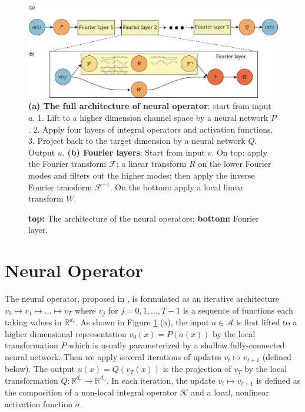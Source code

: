 \documentclass{article} %
\newcommand{\R}{\mathbb{R}}
\newcommand{\A}{\mathcal{A}}
\newcommand{\cG}{\mathcal{F}}
\newcommand{\cK}{\mathcal{K}}
\begin{document}

\begin{figure}
    \centering
    \includegraphics[width=14cm]{figs/fourier_full_arch5.png}\\
    \small{
    {\bf (a) The full architecture of neural operator}: start from input $a$. 1. Lift to a higher dimension channel space by a neural network $P$. 2. Apply four layers of integral operators and activation functions. 3. Project back to the target dimension by a neural network $Q$. Output $u$.
    {\bf (b) Fourier layers}: Start from input $v$. On top: apply the Fourier transform $\cG$; a linear transform $R$ on the lower Fourier modes and filters out the higher modes; then apply the inverse Fourier transform $\cG^{-1}$. On the bottom: apply a local linear transform $W$.
    }
    \caption{ {\bf top:} The architecture of the neural operators; \textbf{bottom:} Fourier layer.}
    \label{fig:arch}
\end{figure}

\section{Neural Operator}
The neural operator, proposed in \citep{li2020neural}, is formulated as an iterative architecture $v_0 \mapsto v_1 \mapsto \ldots \mapsto v_T$ where $v_j$ for $j=0,1,\dots,T-1$
is a sequence of functions each taking values in $\R^{d_v}$. As shown in Figure \ref{fig:arch} (a), the input \(a \in \A\) is first lifted to a higher dimensional representation $v_0(x) = P(a(x))$ by the local transformation \(P\) which is usually parameterized by a shallow fully-connected neural network. Then we apply several iterations of updates $v_t \mapsto v_{t+1}$ (defined below). The output $u(x) = Q(v_T(x))$ is the projection of $v_T$ by the local transformation $Q: \R^{d_v} \to \R^{d_u}$. In each iteration, the update $v_t \mapsto v_{t+1}$ is defined as the composition of a non-local integral operator $\cK$ and a local, nonlinear activation function $\sigma$.
\end{document}
